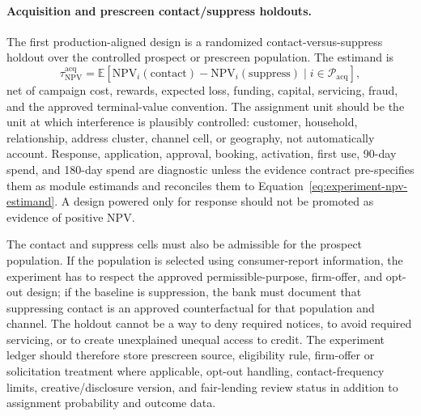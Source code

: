 \documentclass[11pt]{article}
\newcommand{\E}{\mathbb{E}}
\newcommand{\NPV}{\mathrm{NPV}}
\newcommand{\1}{\mathbf{1}}
\begin{document}
\paragraph{Acquisition and prescreen contact/suppress holdouts.}
The first production-aligned design is a randomized contact-versus-suppress
holdout over the controlled prospect or prescreen population. The estimand is
\begin{equation}
  \tau^{\mathrm{acq}}_{\NPV}
  =
  \E[\NPV_i(\mathrm{contact})-\NPV_i(\mathrm{suppress})
  \mid i\in\mathcal{P}_{\mathrm{acq}}],
  \label{eq:acq-holdout-estimand}
\end{equation}
net of campaign cost, rewards, expected loss, funding, capital, servicing,
fraud, and the approved terminal-value convention. The assignment unit should
be the unit at which interference is plausibly controlled: customer,
household, relationship, address cluster, channel cell, or geography, not
automatically account. Response, application, approval, booking, activation,
first use, 90-day spend, and 180-day spend are diagnostic unless the evidence
contract pre-specifies them as module estimands and reconciles them to
Equation~\eqref{eq:experiment-npv-estimand}. A design powered only for
response should not be promoted as evidence of positive NPV.

The contact and suppress cells must also be admissible for the prospect
population. If the population is selected using consumer-report information,
the experiment has to respect the approved permissible-purpose, firm-offer,
and opt-out design; if the baseline is suppression, the bank must document
that suppressing contact is an approved counterfactual for that population and
channel. The holdout cannot be a way to deny required notices, to avoid
required servicing, or to create unexplained unequal access to credit. The
experiment ledger should therefore store prescreen source, eligibility rule,
firm-offer or solicitation treatment where applicable, opt-out handling,
contact-frequency limits, creative/disclosure version, and fair-lending review
status in addition to assignment probability and outcome data.
\end{document}
